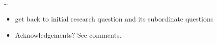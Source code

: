 \dots



\begin{itemize}
  \item
    get back to initial research question and its subordinate questions
  \item
    Acknowledgements? See comments.
\end{itemize}
